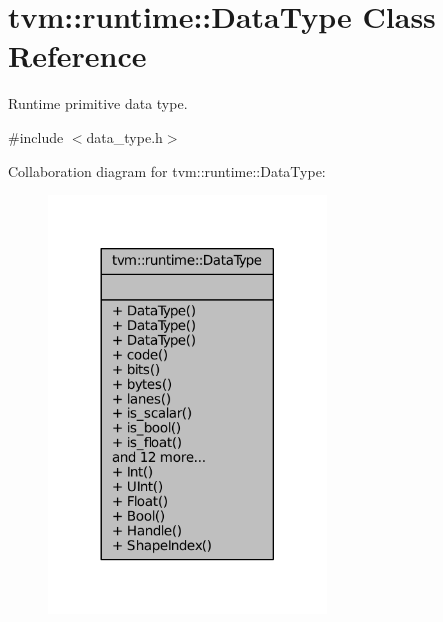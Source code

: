\hypertarget{classtvm_1_1runtime_1_1DataType}{}\section{tvm\+:\+:runtime\+:\+:Data\+Type Class Reference}
\label{classtvm_1_1runtime_1_1DataType}


Runtime primitive data type.  




{\ttfamily \#include $<$data\+\_\+type.\+h$>$}



Collaboration diagram for tvm\+:\+:runtime\+:\+:Data\+Type\+:
\nopagebreak
\begin{figure}[H]
\begin{center}
\leavevmode
\includegraphics[width=209pt]{classtvm_1_1runtime_1_1DataType__coll__graph}
\end{center}
\end{figure}
